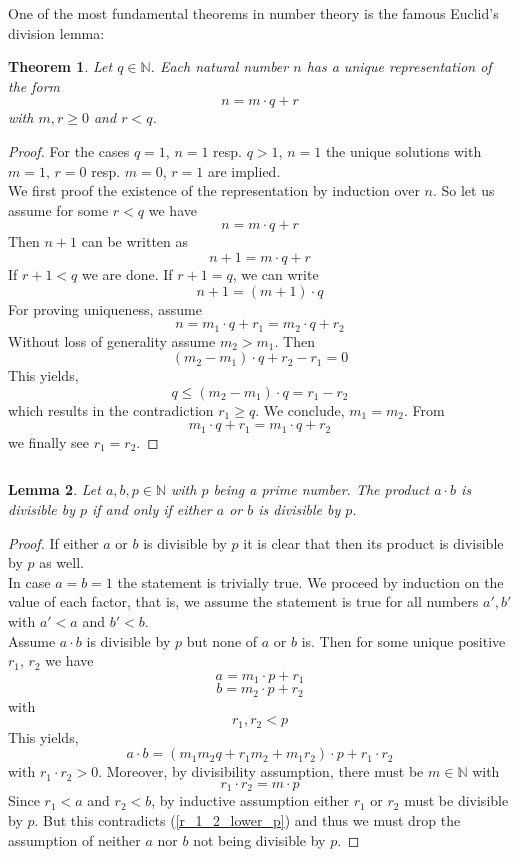 \documentclass[17pt]{extarticle}
\newtheorem{theorem}{Theorem}
\newtheorem{lemma}[theorem]{Lemma}
\begin{document}
One of the most fundamental theorems in number theory is the famous Euclid's division lemma:
\begin{theorem} \label{euclidian_division}
	Let $q\in\mathbb{N}$. Each natural number $n$ has a unique representation of the form
	$$n=m\cdot q+r$$
	with $m, r\geq 0$ and $r<q$.
\end{theorem}
\begin{proof}
	For the cases $q=1$, $n=1$ resp. $q>1$, $n=1$ the unique solutions with $m=1$, $r=0$ 
	resp. $m=0$, $r=1$ are implied.\\
	We first proof the existence of the representation by induction over $n$. So let us assume for some $r<q$ we have
	$$n=m\cdot q+r$$
	Then $n+1$ can be written as
	$$n+1=m\cdot q+r$$
	If $r+1<q$ we are done. If $r+1=q$, we can write
	$$n+1=(m+1)\cdot q$$
	For proving uniqueness, assume
	$$n=m_1\cdot q+r_1=m_2\cdot q+r_2$$
	Without loss of generality assume $m_2>m_1$. Then 
	$$(m_2-m_1)\cdot q + r_2-r_1=0$$
	This yields,
	$$q\leq (m_2-m_1)\cdot q = r_1-r_2$$
	which results in the contradiction $r_1\geq q$.
	We conclude, $m_1=m_2$. From
	$$m_1\cdot q+r_1=m_1\cdot q+r_2$$
	we finally see $r_1=r_2$.	
\end{proof}
$ $\newline
\begin{lemma}
	Let $a,b,p\in \mathbb{N}$ with $p$ being a prime number. The product $a\cdot b$ is divisible by $p$ if and only if either $a$ or $b$ is divisible by $p$.
\end{lemma}
\begin{proof}
	If either $a$ or $b$ is divisible by $p$ it is clear that then its product is divisible by $p$ as well.\\
	In case $a=b=1$ the statement is trivially true. We proceed by induction on the value of each factor, that is,
	we assume the statement is true for all numbers $a', b'$ with $a'<a$ and $b'<b$.\\
	Assume $a\cdot b$ is divisible by $p$ but none of $a$ or $b$ is. Then for some unique positive $r_1$, $r_2$
	we have
	$$a=m_1\cdot p+r_1$$
	$$b=m_2\cdot p+r_2$$
	with
	\begin{equation} \label{r_1_2_lower_p}
		r_1, r_2<p
	\end{equation}
	This yields,
	$$a\cdot b=(m_1m_2q+r_1m_2+m_1r_2)\cdot p + r_1\cdot r_2$$
	with $r_1\cdot r_2>0$.
	Moreover, by divisibility assumption, there must be $m\in\mathbb{N}$ with
	$$r_1\cdot r_2=m\cdot p$$
	Since $r_1<a$ and $r_2<b$, by inductive assumption either $r_1$ or $r_2$ must be divisible by $p$.
	But this contradicts (\ref{r_1_2_lower_p}) and thus we must drop the assumption of neither $a$ nor $b$ not being divisible by $p$.	
\end{proof}
\end{document}
